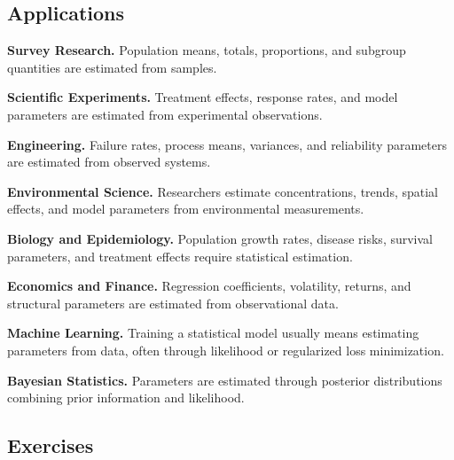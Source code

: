 \subsection{Applications}
\label{subsec:statistical-estimation-applications}

\begin{applicationbox}

\textbf{Survey Research.}
Population means, totals, proportions, and subgroup quantities are
estimated from samples.

\medskip

\textbf{Scientific Experiments.}
Treatment effects, response rates, and model parameters are estimated
from experimental observations.

\medskip

\textbf{Engineering.}
Failure rates, process means, variances, and reliability parameters are
estimated from observed systems.

\medskip

\textbf{Environmental Science.}
Researchers estimate concentrations, trends, spatial effects, and model
parameters from environmental measurements.

\medskip

\textbf{Biology and Epidemiology.}
Population growth rates, disease risks, survival parameters, and
treatment effects require statistical estimation.

\medskip

\textbf{Economics and Finance.}
Regression coefficients, volatility, returns, and structural parameters
are estimated from observational data.

\medskip

\textbf{Machine Learning.}
Training a statistical model usually means estimating parameters from
data, often through likelihood or regularized loss minimization.

\medskip

\textbf{Bayesian Statistics.}
Parameters are estimated through posterior distributions combining prior
information and likelihood.

\end{applicationbox}

\subsection{Exercises}
\label{subsec:statistical-estimation-exercises}

